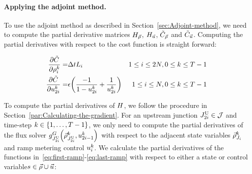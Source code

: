 														
							\paragraph{Applying the adjoint method.}
														
							To use the adjoint method as described in Section~\ref{sec:Adjoint-method},
							we need to compute the partial derivative matrices $H_{\vec{\rho}}$, $H_{\vec{u}}$,
							$\tilde{C}_{\vec{\rho}}$ and $\tilde{C}_{\vec{u}}$. Computing the partial
							derivatives with respect to the cost function is straight forward:
														
							\begin{eqnarray*}
								\pfrac{\tilde{\cost}}{\discrete{\link}{\tind}}= & \Delta tL_{i} & 1\le i\le2\nlinks,0\le k\le T-1\\
								\pfrac{\tilde{\cost}}{\ramp_{2\link}^{\tind}}= & \barrierTerm\left(\frac{-1}{1-\ramp_{2\link}^{\tind}}+\frac{1}{\ramp_{2\link}^{\tind}}\right) & 1\le i\le\nlinks,0\le k\le T-1
							\end{eqnarray*}
														
														
							To compute the partial derivatives of $H$, we follow the procedure
							in Section~\ref{par:Calculating-the-gradient}. For an upstream junction
							$J_{2i}^{\text{U}}\in\mathcal{J}$ and time-step $k\in\intrange 1{\ntime-1}$,
							we only need to compute the partial derivatives of the flux solver
							$\god_{\jup{2\link}}\left(\juncstate{\jup{2\link}}{\tind},\ramp_{2\link-1}^{\tind}\right)_{\text{}}$
							with respect to the adjacent state variables $\vec{\rho}_{J_{i}}^{k}$
							and ramp metering control $u_{i}^{k}$. We calculate the
							partial derivatives of the functions in~\eqref{eq:first-ramp}-\eqref{eq:last-ramp}
							with respect to either a state or control variable$s\in\vec{\rho}\cup\vec{u}$:
														
